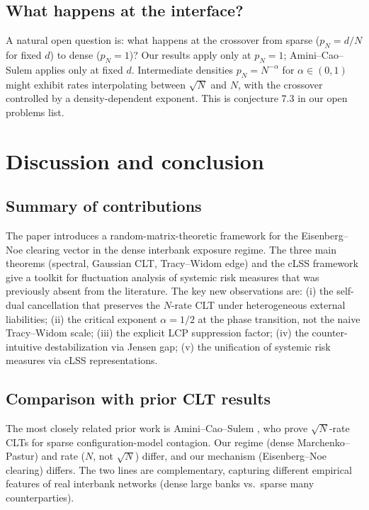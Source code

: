 \documentclass[11pt,a4paper]{article}
\theoremstyle{definition}
\begin{document}
\subsection{What happens at the interface?}

A natural open question is: what happens at the crossover from sparse
($p_N = d/N$ for fixed $d$) to dense ($p_N = 1$)? Our results apply only at
$p_N = 1$; Amini--Cao--Sulem applies only at fixed $d$. Intermediate
densities $p_N = N^{-\alpha}$ for $\alpha\in(0,1)$ might exhibit rates
interpolating between $\sqrt N$ and $N$, with the crossover controlled by a
density-dependent exponent. This is conjecture 7.3 in our open problems list.

\section{Discussion and conclusion}
\label{sec:discussion}

\subsection{Summary of contributions}

The paper introduces a random-matrix-theoretic framework for the
Eisenberg--Noe clearing vector in the dense interbank exposure regime. The
three main theorems (spectral, Gaussian CLT, Tracy--Widom edge) and the
cLSS framework give a toolkit for fluctuation analysis of systemic risk
measures that was previously absent from the literature. The key new
observations are: (i) the self-dual cancellation that preserves the $N$-rate
CLT under heterogeneous external liabilities; (ii) the critical exponent
$\alpha = 1/2$ at the phase transition, not the naive Tracy--Widom scale;
(iii) the explicit LCP suppression factor; (iv) the counter-intuitive
destabilization via Jensen gap; (v) the unification of systemic risk
measures via cLSS representations.

\subsection{Comparison with prior CLT results}

The most closely related prior work is Amini--Cao--Sulem
\cite{AminiCaoSulem2021,AminiCaoSulem2024SIAM}, who prove $\sqrt N$-rate
CLTs for sparse configuration-model contagion. Our regime (dense
Marchenko--Pastur) and rate ($N$, not $\sqrt N$) differ, and our mechanism
(Eisenberg--Noe clearing) differs. The two lines are complementary, capturing
different empirical features of real interbank networks (dense large banks
vs.\ sparse many counterparties).
\end{document}
